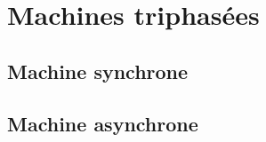 \setchapterpreamble[u]{\margintoc}

\chapter{Machines triphasées}








\section{Machine synchrone}

\section{Machine asynchrone}

